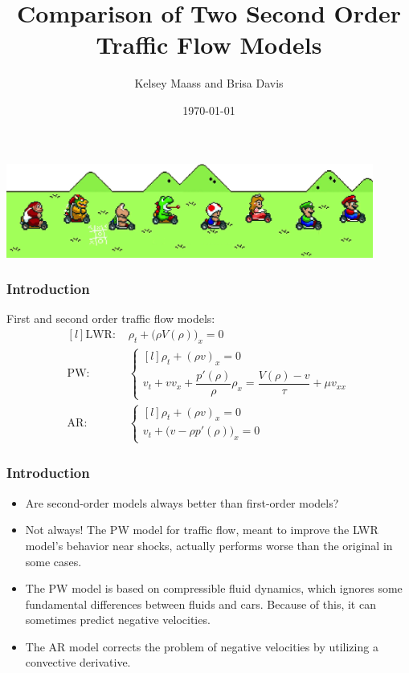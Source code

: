 \documentclass{beamer}
\title[Short title]{Comparison of Two Second Order Traffic Flow Models} %
\author{Kelsey Maass and Brisa Davis} %
\institute[UW] %
{
AMATH 574 \\ %
Group 6
\medskip
}
\date{\today} %
\begin{document}
\begin{frame}
\titlepage %
\includegraphics[width=4.75in]{mariokart.png}
\end{frame}

\begin{frame}
\frametitle{Introduction}
\hspace{4.75em} First and second order traffic flow models: \\[3ex]

\[ \begin{matrix*}[l]
\text{LWR: } & \rho_t + \Big(\rho V(\rho)\Big)_x = 0 \\[4ex]

\text{PW: } & \left\{ \begin{matrix*}[l] \rho_t + (\rho v)_x = 0 \\[1ex] v_t + v v_x + \dfrac{p'(\rho)}{\rho} \rho_x = \dfrac{V(\rho) - v}{\tau} + \mu v_{xx} \end{matrix*} \right. \\[6ex]

\text{AR: } &  \left\{ \begin{matrix*}[l] \rho_t + (\rho v)_x = 0 \\[1ex] v_t + \Big( v - \rho p'(\rho) \Big)_x = 0 \end{matrix*} \right.
\end{matrix*} \]



\end{frame}

\begin{frame}
\frametitle{Introduction} 
\begin{itemize}
\item Are second-order models always better than first-order models?
\item Not always! The PW model for traffic flow, meant to improve the LWR model's behavior near shocks, actually performs worse than the original in some cases.
\item The PW model is based on compressible fluid dynamics, which ignores some fundamental differences between fluids and cars. Because of this, it can sometimes predict negative velocities.
\item The AR model corrects the problem of negative velocities by utilizing a convective derivative.
\end{itemize}
\end{frame}
\end{document}
